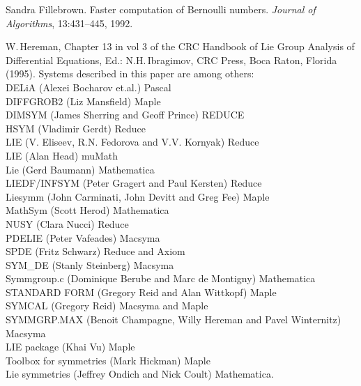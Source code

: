 

\begin{thebibliography}{999}

Sandra Fillebrown.
\newblock Faster computation of Bernoulli numbers.
\newblock \emph{Journal of Algorithms}, 13:431--445, 1992.



 W.\,Hereman, Chapter 13 in vol 3 of the CRC Handbook of
Lie Group Analysis of Differential Equations, Ed.: N.H.\,Ibragimov,
CRC Press, Boca Raton, Florida (1995).
Systems described in this paper are among others:  \\
DELiA (Alexei Bocharov et.al.) Pascal \\
DIFFGROB2 (Liz Mansfield) Maple \\
DIMSYM (James Sherring and Geoff Prince) REDUCE \\
HSYM (Vladimir Gerdt) Reduce \\
LIE (V. Eliseev, R.N. Fedorova and V.V. Kornyak) Reduce \\
LIE (Alan Head) muMath \\
Lie (Gerd Baumann) Mathematica \\
LIEDF/INFSYM (Peter Gragert and Paul Kersten) Reduce \\
Liesymm (John Carminati, John Devitt and Greg Fee) Maple \\
MathSym (Scott Herod) Mathematica \\
NUSY (Clara Nucci) Reduce \\
PDELIE (Peter Vafeades) Macsyma \\
SPDE (Fritz Schwarz) Reduce and Axiom \\
SYM\_DE (Stanly Steinberg) Macsyma \\
Symmgroup.c (Dominique Berube and Marc de Montigny) Mathematica \\
STANDARD FORM (Gregory Reid and Alan Wittkopf) Maple \\
SYMCAL (Gregory Reid) Macsyma and Maple \\
SYMMGRP.MAX (Benoit Champagne, Willy Hereman and Pavel Winternitz) Macsyma \\
LIE package (Khai Vu) Maple \\
Toolbox for symmetries (Mark Hickman) Maple \\
Lie symmetries (Jeffrey Ondich and Nick Coult) Mathematica.


\end{thebibliography}
